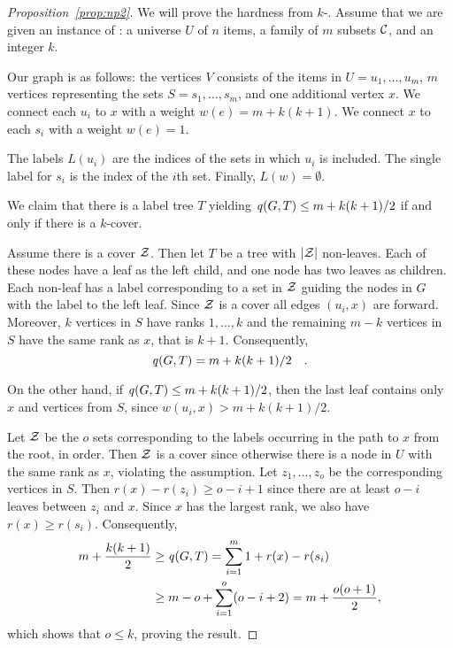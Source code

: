 \begin{proof}[Proposition~\ref{prop:np2}]
We will prove the hardness from $k$-\prbcover.
Assume that we are given an instance of \prbcover:
a universe $U$ of $n$ items, a
family of $m$ subsets ${\mathcal{C}}$, and an integer $k$.

Our graph is as follows: the
vertices $V$ consists of the items in $U = u_1, \ldots, u_m$, $m$ vertices representing
the sets $S = s_1, \ldots, s_m$, 
and one additional
vertex $x$.  We connect each $u_i$ to $x$ with a weight $w(e) = m + k(k + 1)$.
We connect $x$ to each $s_i$ with a weight $w(e) = 1$.

The labels $L(u_i)$ are the indices of the sets in which $u_i$ is included. The
single label for $s_i$ is the index of the $i$th set.  Finally, $L(w) =
\emptyset$.

We claim that there is a label tree $T$ yielding
$\labelscore{G, T} \leq m + k(k + 1)/2$ if and only if there is a $k$-cover.

Assume there is a cover ${\mathcal{Z}}$. Then let $T$ be a tree with ${\left|{\mathcal{Z}}\right|}$ non-leaves.
Each of these nodes have a leaf as the left child, and one node has two leaves
as children. Each non-leaf has a label corresponding to a set in ${\mathcal{Z}}$
guiding the nodes in $G$ with the label to the left leaf.
Since ${\mathcal{Z}}$ is a cover all 
edges $(u_i, x)$ are forward. Moreover, $k$ vertices in $S$ have ranks $1, \ldots, k$
and the remaining $m - k$ vertices in $S$ have the same rank as $x$, that is $k + 1$. Consequently,
\[
	\labelscore{G, T} = m + k(k + 1)/2\quad.
\]



On the other hand, if $\labelscore{G, T} \leq m + k(k + 1)/2$, then the last leaf contains only $x$
and vertices from $S$, since $w(u_i, x) > m + k(k + 1)/2$.

Let ${\mathcal{Z}}$ be the $o$ sets corresponding to the labels occurring in the path to
$x$ from the root, in order. Then ${\mathcal{Z}}$ is a cover since otherwise there is a
node in $U$ with the same rank as $x$, violating the assumption. 
Let $z_1, \ldots, z_o$ be the corresponding vertices in $S$.
Then $r(x) - r(z_i) \geq o - i + 1$ since there are at least $o - i$ leaves between $z_i$ and $x$.
Since $x$ has the largest rank, we also have $r(x) \geq r(s_i)$. Consequently,
\[
\begin{split}
	 m + \frac{k(k + 1)}{2} & \geq \labelscore{G, T} = \sum_{i = 1}^m 1 + r(x) - r(s_i) \\
	 & \geq m - o + \sum_{i = 1}^o (o - i + 2) = m + \frac{o(o + 1)}{2}, \\
\end{split}
\]
which shows that $o \leq k$, proving the result.
\end{proof}


